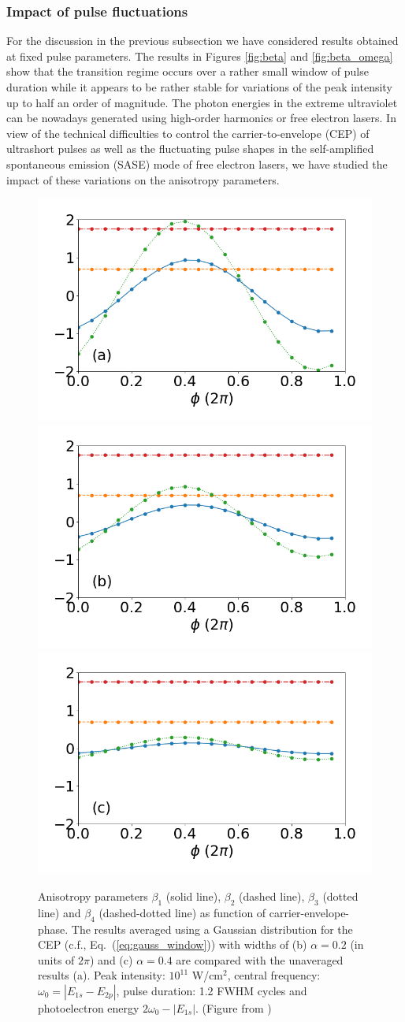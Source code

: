 \subsubsection{\label{ssub:variation} Impact of pulse fluctuations}
For the discussion in the previous subsection we have considered results obtained at fixed pulse parameters. The results in Figures \ref{fig:beta} and \ref{fig:beta_omega} show that the transition regime occurs over a rather small window of pulse duration while it appears to be rather stable for variations of the peak intensity up to half an order of magnitude. The photon energies in the extreme ultraviolet can be nowadays generated using high-order harmonics or free electron lasers. In view of the technical difficulties to control the carrier-to-envelope (CEP) of ultrashort pulses as well as the fluctuating pulse shapes in the self-amplified spontaneous emission (SASE) mode of free electron lasers, we have studied the impact of these variations on the anisotropy parameters. 

\begin{figure}[!ht]
\centering
\includegraphics[width=0.32\linewidth]{figs/Photo_ionization/short_pulse/Beta_vs_cep.png}
\includegraphics[width=0.32\linewidth]{figs/Photo_ionization/short_pulse/Beta_vs_cep_0p20.png}
\includegraphics[width=0.32\linewidth]{figs/Photo_ionization/short_pulse/Beta_vs_cep_0p40.png}
\caption{
Anisotropy parameters $\beta_1$ (solid line), $\beta_2$ (dashed line), $\beta_3$ (dotted line) and $\beta_4$ (dashed-dotted line) as function of carrier-envelope-phase. The results averaged using a Gaussian distribution for the CEP (c.f., Eq.\ (\ref{eq:gauss_window})) with widths of (b) $\alpha = 0.2$ (in units of $2\pi$) and (c) $\alpha = 0.4$ are compared with the unaveraged results (a). Peak intensity: $10^{11}$ W/cm$^2$, central frequency:  $\omega_0 = |E_{1s}-E_{2p}|$, pulse duration: 1.2 FWHM cycles and photoelectron energy $2\omega_0 - |E_{1s}|$. (Figure from \cite{venzke2020_ionization})
} 
  \label{fig:beta_cep}
\end{figure}


